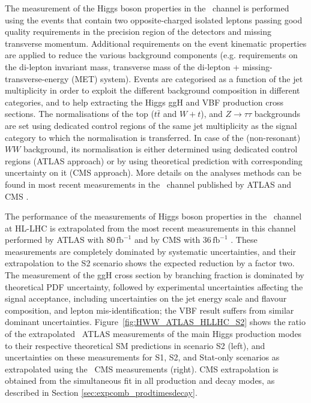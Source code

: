 
The measurement of the Higgs boson properties in the \HWW\ channel is performed using the events that contain two opposite-charged isolated leptons passing good quality requirements in the precision region of the detectors and missing transverse momentum. Additional requirements on the event kinematic properties are applied to reduce the various background components (e.g. requirements on the di-lepton invariant mass, transverse mass of the di-lepton + missing-transverse-energy (MET) system). Events are categorised as a function of the jet multiplicity in order to exploit the different background composition in different categories, and to help extracting the Higgs ggH and VBF production cross sections. The normalisations of the top ($t\bar{t}$ and $W+t$), and $Z\rightarrow\tau\tau$ backgrounds are set using dedicated control regions of the same jet multiplicity as the signal category to which the normalisation is transferred. In case of the (non-resonant) $WW$ background, its normalisation is either determined using dedicated control regions (ATLAS approach) or by using theoretical prediction with corresponding uncertainty on it (CMS approach). More details on the analyses methods can be found in most recent measurements in the \HWW\ channel published by ATLAS \cite{Aaboud:2018jqu} and CMS \cite{Sirunyan:2018egh}.

The performance of the measurements of Higgs boson properties in the \HWW\ channel at HL-LHC is extrapolated from the most recent measurements in this channel performed by ATLAS with 80\,$\mathrm{fb}^{-1}$ \cite{Aaboud:2018jqu} and by CMS with 36\,$\mathrm{fb}^{-1}$ \cite{Sirunyan:2018egh}. These measurements are completely dominated by systematic uncertainties, and their extrapolation to the S2 scenario shows the expected reduction by a factor two. The measurement of the ggH cross section by branching fraction is dominated by theoretical PDF uncertainty, followed by experimental uncertainties affecting the signal acceptance, including uncertainties on the jet energy scale and flavour composition, and lepton mis-identification; the VBF result suffers from similar dominant uncertainties.
Figure~\ref{fig:HWW_ATLAS_HLLHC_S2} shows the ratio of the extrapolated \HWW\ ATLAS measurements of the main Higgs production modes to their respective theoretical SM predictions in scenario S2 (left), and uncertainties on these measurements for S1, S2, and Stat-only scenarios as extrapolated using the \HWW\ CMS measurements (right). CMS extrapolation is obtained from the simultaneous fit in all production and decay modes, as described in Section \ref{sec:expcomb_prodtimesdecay}.

